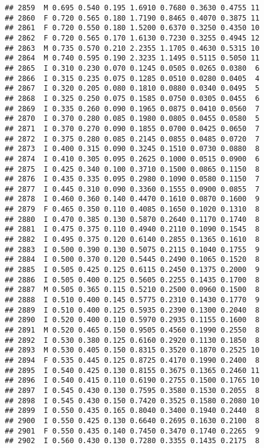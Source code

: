 \documentclass[
]{article}
\begin{document}
\begin{verbatim}
## 2859  M 0.695 0.540 0.195 1.6910 0.7680 0.3630 0.4755 11
## 2860  F 0.720 0.565 0.180 1.7190 0.8465 0.4070 0.3875 11
## 2861  F 0.720 0.550 0.180 1.5200 0.6370 0.3250 0.4350 10
## 2862  F 0.720 0.565 0.170 1.6130 0.7230 0.3255 0.4945 12
## 2863  M 0.735 0.570 0.210 2.2355 1.1705 0.4630 0.5315 10
## 2864  M 0.740 0.595 0.190 2.3235 1.1495 0.5115 0.5050 11
## 2865  I 0.310 0.230 0.070 0.1245 0.0505 0.0265 0.0380  6
## 2866  I 0.315 0.235 0.075 0.1285 0.0510 0.0280 0.0405  4
## 2867  I 0.320 0.205 0.080 0.1810 0.0880 0.0340 0.0495  5
## 2868  I 0.325 0.250 0.075 0.1585 0.0750 0.0305 0.0455  6
## 2869  I 0.335 0.260 0.090 0.1965 0.0875 0.0410 0.0560  7
## 2870  I 0.370 0.280 0.085 0.1980 0.0805 0.0455 0.0580  5
## 2871  I 0.370 0.270 0.090 0.1855 0.0700 0.0425 0.0650  7
## 2872  I 0.375 0.280 0.085 0.2145 0.0855 0.0485 0.0720  7
## 2873  I 0.400 0.315 0.090 0.3245 0.1510 0.0730 0.0880  8
## 2874  I 0.410 0.305 0.095 0.2625 0.1000 0.0515 0.0900  6
## 2875  I 0.425 0.340 0.100 0.3710 0.1500 0.0865 0.1150  8
## 2876  I 0.435 0.335 0.095 0.2980 0.1090 0.0580 0.1150  7
## 2877  I 0.445 0.310 0.090 0.3360 0.1555 0.0900 0.0855  7
## 2878  I 0.460 0.360 0.140 0.4470 0.1610 0.0870 0.1600  9
## 2879  F 0.465 0.350 0.110 0.4085 0.1650 0.1020 0.1310  8
## 2880  I 0.470 0.385 0.130 0.5870 0.2640 0.1170 0.1740  8
## 2881  I 0.475 0.375 0.110 0.4940 0.2110 0.1090 0.1545  8
## 2882  I 0.495 0.375 0.120 0.6140 0.2855 0.1365 0.1610  8
## 2883  I 0.500 0.390 0.130 0.5075 0.2115 0.1040 0.1755  9
## 2884  I 0.500 0.370 0.120 0.5445 0.2490 0.1065 0.1520  8
## 2885  I 0.505 0.425 0.125 0.6115 0.2450 0.1375 0.2000  9
## 2886  I 0.505 0.400 0.125 0.5605 0.2255 0.1435 0.1700  8
## 2887  M 0.505 0.365 0.115 0.5210 0.2500 0.0960 0.1500  8
## 2888  I 0.510 0.400 0.145 0.5775 0.2310 0.1430 0.1770  9
## 2889  I 0.510 0.400 0.125 0.5935 0.2390 0.1300 0.2040  8
## 2890  I 0.520 0.400 0.110 0.5970 0.2935 0.1155 0.1600  8
## 2891  M 0.520 0.465 0.150 0.9505 0.4560 0.1990 0.2550  8
## 2892  I 0.530 0.380 0.125 0.6160 0.2920 0.1130 0.1850  8
## 2893  M 0.530 0.405 0.150 0.8315 0.3520 0.1870 0.2525 10
## 2894  F 0.535 0.445 0.125 0.8725 0.4170 0.1990 0.2400  8
## 2895  I 0.540 0.425 0.130 0.8155 0.3675 0.1365 0.2460 11
## 2896  I 0.540 0.415 0.110 0.6190 0.2755 0.1500 0.1765 10
## 2897  I 0.545 0.430 0.130 0.7595 0.3580 0.1530 0.2055  8
## 2898  I 0.545 0.430 0.150 0.7420 0.3525 0.1580 0.2080 10
## 2899  I 0.550 0.435 0.165 0.8040 0.3400 0.1940 0.2440  8
## 2900  I 0.550 0.425 0.130 0.6640 0.2695 0.1630 0.2100  8
## 2901  F 0.550 0.435 0.140 0.7450 0.3470 0.1740 0.2265  9
## 2902  I 0.560 0.430 0.130 0.7280 0.3355 0.1435 0.2175  8

\end{verbatim}
\end{document}
